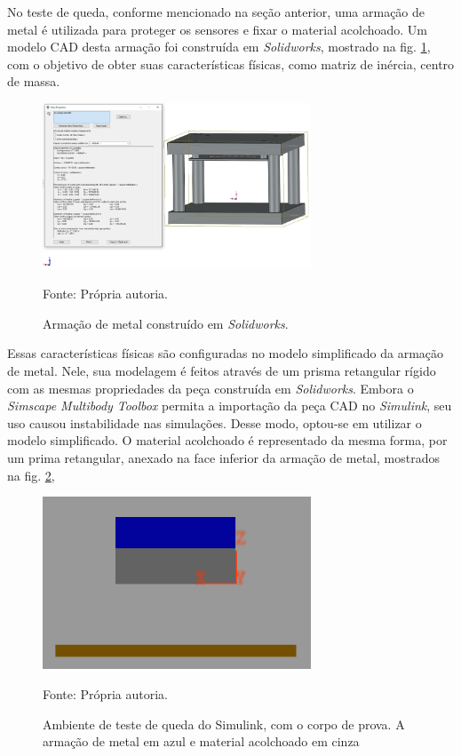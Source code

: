 No teste de queda, conforme mencionado na seção anterior, uma armação de metal é utilizada para proteger os sensores e fixar o material acolchoado. Um modelo CAD desta armação foi construída em \textit{Solidworks}, mostrado na fig. \ref{fig:corpodeprovacad}, com o objetivo de obter suas características físicas, como matriz de inércia, centro de massa.

 \begin{figure}[H] 
        \centering
        \caption{Armação de metal construído em \textit{Solidworks}.}
        \includegraphics[width=8cm]{./figs/corpodeprova_cad.png}
        \par\medskip
        Fonte: Própria autoria.
        \label{fig:corpodeprovacad}
\end{figure}

Essas características físicas são configuradas no modelo simplificado da armação de metal. Nele, sua modelagem é feitos através de um prisma retangular rígido com as mesmas propriedades da peça construída em \textit{Solidworks}. Embora o \textit{Simscape Multibody Toolbox} permita a importação da peça CAD no \textit{Simulink}, seu uso causou instabilidade nas simulações. Desse modo, optou-se em utilizar o modelo simplificado.
O material acolchoado é representado da mesma forma, por um prima retangular, anexado na face inferior da armação de metal, mostrados na fig. \ref{fig:corpodeprovasimulink}, 

 \begin{figure}[H] 
        \centering
        \caption{Ambiente de teste de queda do Simulink, com o corpo de prova. A armação de metal em azul e material acolchoado em cinza}
        \includegraphics[width=8cm]{./figs/corpodeprova_simulink.png}
        \par\medskip
        Fonte: Própria autoria.
        \label{fig:corpodeprovasimulink}
\end{figure}


